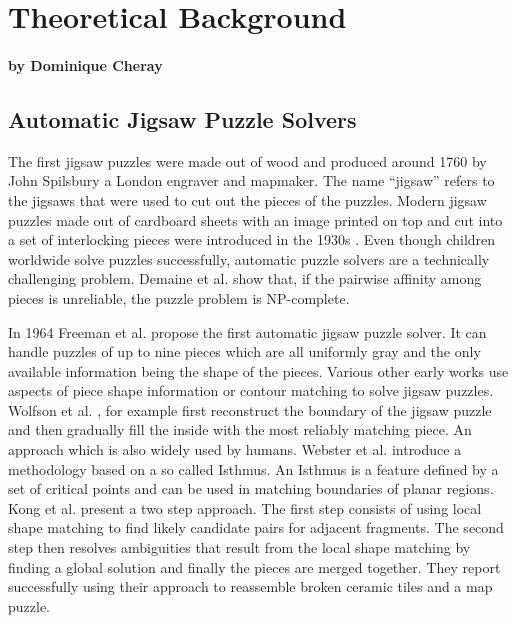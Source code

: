 \documentclass[11pt]{report}
\begin{document}
\chapter{Theoretical Background}
\subsubsection*{by Dominique Cheray}
\section{Automatic Jigsaw Puzzle Solvers}
The first jigsaw puzzles were made out of wood and produced around 1760 by John
Spilsbury a London engraver and mapmaker. The name ``jigsaw'' refers to the
jigsaws that were used to cut out the pieces of the puzzles. Modern jigsaw
puzzles made out of cardboard sheets with an image printed on top and cut into a
set of interlocking pieces were introduced in the 1930s
\cite{williams2004jigsaw}. Even though children worldwide solve puzzles
successfully, automatic puzzle solvers are a technically challenging problem.
Demaine et al. \cite{demaine2007jigsaw} show that, if the pairwise affinity
among pieces is unreliable, the puzzle problem is NP-complete.

In 1964 Freeman et al. \cite{freeman1964apictorial} propose the first automatic
jigsaw puzzle solver. It can handle puzzles of up to nine pieces which are all
uniformly gray and the only available information being the shape of the pieces.
Various other early works use aspects of piece shape information or contour
matching to solve jigsaw puzzles. Wolfson et al. \cite{wolfson1988solving}, for example first
reconstruct the boundary of the jigsaw puzzle and then gradually fill the inside
with the most reliably matching piece. An approach which is also widely used by
humans. Webster et al. \cite{webster1990computer} introduce a methodology
based on a so called Isthmus. An Isthmus is a feature defined by a set of
critical points and can be used in matching boundaries of planar regions. Kong
et al. \cite{kong2001solving} present a two step approach. The first step
consists of using local shape matching to find likely candidate pairs for
adjacent fragments. The second step then resolves ambiguities that result from the
local shape matching by finding a global solution and finally the pieces are
merged together. They report successfully using their approach to reassemble
broken ceramic tiles and a map puzzle.
\end{document}
